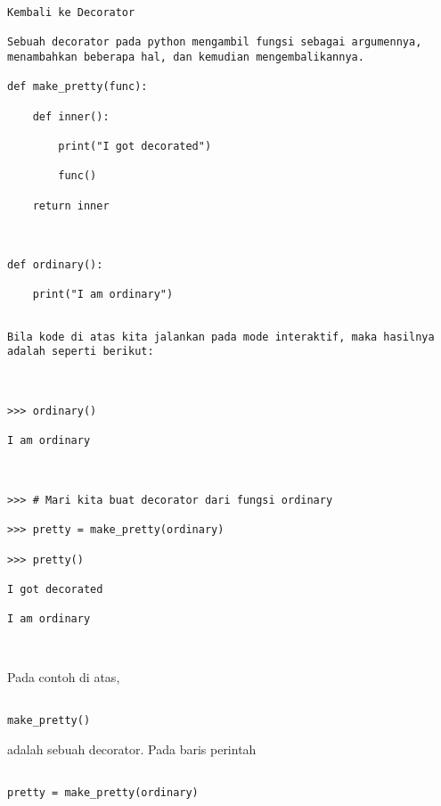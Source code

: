 \begin{verbatim}
Kembali ke Decorator

Sebuah decorator pada python mengambil fungsi sebagai argumennya, menambahkan beberapa hal, dan kemudian mengembalikannya.

def make_pretty(func):

    def inner():

        print("I got decorated")

        func()

    return inner



def ordinary():

    print("I am ordinary")

\end{verbatim}









\begin{verbatim}

Bila kode di atas kita jalankan pada mode interaktif, maka hasilnya adalah seperti berikut:



>>> ordinary()

I am ordinary



>>> # Mari kita buat decorator dari fungsi ordinary

>>> pretty = make_pretty(ordinary)

>>> pretty()

I got decorated

I am ordinary



\end{verbatim}



Pada contoh di atas, 

\begin{verbatim}

make_pretty()

\end{verbatim}  

adalah sebuah decorator. Pada baris perintah 



\begin{verbatim}

pretty = make_pretty(ordinary)

\end{verbatim}



